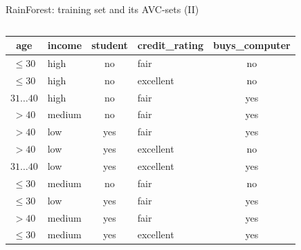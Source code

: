 \documentclass[aspectratio=169,t,table]{beamer}
\begin{document}
  {
    \begin{frame}{RainForest: training set and its AVC-sets (II)}
      \begin{columns}
        \begin{column}{0.6\textwidth}
          \begin{tabular}{|c|l|c|l|c|}
            \hline
            \cellcolor{blue!20}age & \cellcolor{blue!20}income & \cellcolor{blue!20}student & \cellcolor{blue!20}credit\_rating & \cellcolor{brown!20}buys\_computer \\\hline
            \cellcolor{yellow!20}$\leq30$ & \cellcolor{yellow!20}high & \cellcolor{yellow!20}no & \cellcolor{yellow!20}fair & \cellcolor{red!20}no \\\hline
            \cellcolor{yellow!20}$\leq30$ & \cellcolor{yellow!20}high & \cellcolor{yellow!20}no & \cellcolor{yellow!20}excellent & \cellcolor{red!20}no \\\hline
            \cellcolor{yellow!20}$31\ldots40$ & \cellcolor{yellow!20}high & \cellcolor{yellow!20}no & \cellcolor{yellow!20}fair & \cellcolor{green!20}yes \\\hline
            \cellcolor{yellow!20}$>40$ & \cellcolor{yellow!20}medium & \cellcolor{yellow!20}no & \cellcolor{yellow!20}fair & \cellcolor{green!20}yes \\\hline
            \cellcolor{yellow!20}$>40$ & \cellcolor{yellow!20}low & \cellcolor{yellow!20}yes & \cellcolor{yellow!20}fair & \cellcolor{green!20}yes \\\hline
            \cellcolor{yellow!20}$>40$ & \cellcolor{yellow!20}low & \cellcolor{yellow!20}yes & \cellcolor{yellow!20}excellent & \cellcolor{red!20}no \\\hline
            \cellcolor{yellow!20}$31\ldots40$ & \cellcolor{yellow!20}low & \cellcolor{yellow!20}yes & \cellcolor{yellow!20}excellent & \cellcolor{green!20}yes \\\hline
            \cellcolor{yellow!20}$\leq30$ & \cellcolor{yellow!20}medium & \cellcolor{yellow!20}no & \cellcolor{yellow!20}fair & \cellcolor{red!20}no \\\hline
            \cellcolor{yellow!20}$\leq30$ & \cellcolor{yellow!20}low & \cellcolor{yellow!20}yes & \cellcolor{yellow!20}fair & \cellcolor{green!20}yes \\\hline
            \cellcolor{yellow!20}$>40$ & \cellcolor{yellow!20}medium & \cellcolor{yellow!20}yes & \cellcolor{yellow!20}fair & \cellcolor{green!20}yes \\\hline
            \cellcolor{yellow!20}$\leq30$ & \cellcolor{yellow!20}medium & \cellcolor{yellow!20}yes & \cellcolor{yellow!20}excellent & \cellcolor{green!20}yes \\\hline

\end{tabular}
\end{column}
\end{columns}
\end{frame}}
\end{document}
